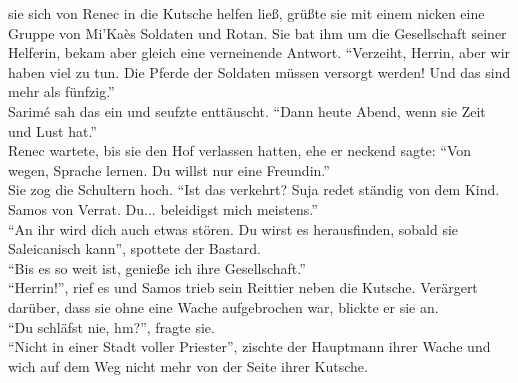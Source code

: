 sie sich von Renec in die Kutsche helfen ließ, grüßte sie mit einem nicken eine Gruppe von Mi'Kaès 
Soldaten und Rotan. Sie bat ihm um die Gesellschaft seiner Helferin, bekam aber gleich eine 
verneinende Antwort. ``Verzeiht, Herrin, aber wir haben viel zu tun. Die Pferde der Soldaten müssen 
versorgt werden! Und das sind mehr als fünfzig.''\\
Sarimé sah das ein und seufzte enttäuscht. ``Dann heute Abend, wenn sie Zeit und Lust hat.''\\
Renec wartete, bis sie den Hof verlassen hatten, ehe er neckend sagte: ``Von wegen, Sprache lernen. 
Du willst nur eine Freundin.''\\
Sie zog die Schultern hoch. ``Ist das verkehrt? Suja redet ständig von dem Kind. Samos von Verrat. 
Du... beleidigst mich meistens.''\\
``An ihr wird dich auch etwas stören. Du wirst es herausfinden, sobald sie Saleicanisch kann'', 
spottete der Bastard.\\
``Bis es so weit ist, genieße ich ihre Gesellschaft.''\\
``Herrin!'', rief es und Samos trieb sein Reittier neben die Kutsche. Verärgert darüber, dass sie 
ohne eine Wache aufgebrochen war, blickte er sie an.\\
``Du schläfst nie, hm?'', fragte sie.\\
``Nicht in einer Stadt voller Priester'', zischte der Hauptmann ihrer Wache und wich auf dem Weg 
nicht mehr von der Seite ihrer Kutsche.

